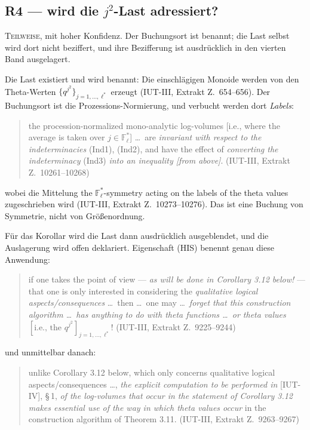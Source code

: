 \documentclass[11pt,a4paper]{article}
\theoremstyle{definition}
\newcommand{\anchor}[2]{(#1, Extrakt Z.~#2)}
\begin{document}
\subsection{R4 --- wird die \texorpdfstring{$j^2$}{j\texttwosuperior}-Last adressiert?}

\textsc{Teilweise}, mit hoher Konfidenz. Der Buchungsort ist benannt; die Last
selbst wird dort nicht beziffert, und ihre Bezifferung ist ausdrücklich in den
vierten Band ausgelagert.

Die Last existiert und wird benannt: Die einschlägigen Monoide werden von den
Theta-Werten $\{q^{j^2}\}_{j=1,\dots,\ell^*}$ erzeugt
\anchor{IUT-III}{654--656}. Der Buchungsort ist die Prozessions-Normierung, und
verbucht werden dort \emph{Labels}:

\begin{quote}\small
\glqq the procession-normalized mono-analytic log-volumes [i.e., where the average is
taken over $j \in \mathbb{F}_\ell^*$] \dots\ are \emph{invariant with respect to
the indeterminacies} (Ind1), (Ind2), and have the effect of \emph{converting the
indeterminacy} (Ind3) \emph{into an inequality [from above]}.\grqq
\hfill\anchor{IUT-III}{10261--10268}
\end{quote}

wobei die Mittelung \glqq the $\mathbb{F}_\ell^*$-symmetry acting on the labels of the
theta values\grqq{} zugeschrieben wird \anchor{IUT-III}{10273--10276}. Das ist eine
Buchung von Symmetrie, nicht von Größenordnung.

Für das Korollar wird die Last dann ausdrücklich ausgeblendet, und die
Auslagerung wird offen deklariert. Eigenschaft (HIS) benennt genau diese
Anwendung:

\begin{quote}\small
\glqq if one takes the point of view --- \emph{as will be done in Corollary 3.12
below!} --- that one is only interested in considering the \emph{qualitative
logical aspects/consequences} \dots\ then \dots\ one may \dots\ \emph{forget that
this construction algorithm \dots\ has anything to do with theta functions \dots\
or theta values} $[\text{i.e., the } q^{j^2}]_{j=1,\dots,\ell^*}$!\grqq
\hfill\anchor{IUT-III}{9225--9244}
\end{quote}

und unmittelbar danach:

\begin{quote}\small
\glqq unlike Corollary 3.12 below, which only concerns qualitative logical
aspects/consequences \dots, \emph{the explicit computation to be performed in}
[IUT-IV], \S\,1, \emph{of the log-volumes that occur in the statement of Corollary
3.12 makes essential use of the way in which theta values occur} in the
construction algorithm of Theorem 3.11.\grqq{} \hfill\anchor{IUT-III}{9263--9267}
\end{quote}
\end{document}
